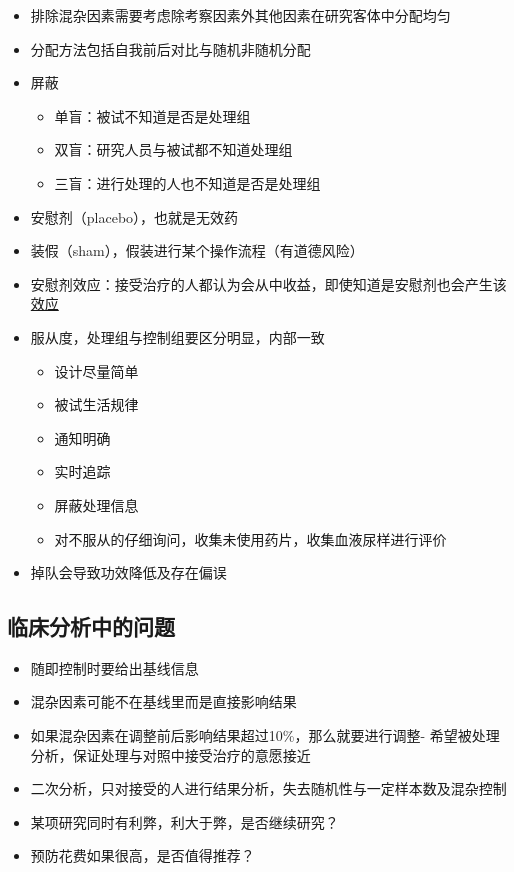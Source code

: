 \documentclass[]{book}
\providecommand{\tightlist}{%
  \setlength{\itemsep}{0pt}\setlength{\parskip}{0pt}}
\begin{document}
\begin{itemize}
\tightlist
\item
  排除混杂因素需要考虑除考察因素外其他因素在研究客体中分配均匀
\item
  分配方法包括自我前后对比与随机非随机分配
\item
  屏蔽

  \begin{itemize}
  \tightlist
  \item
    单盲：被试不知道是否是处理组
  \item
    双盲：研究人员与被试都不知道处理组
  \item
    三盲：进行处理的人也不知道是否是处理组
  \end{itemize}
\item
  安慰剂（placebo），也就是无效药
\item
  装假（sham），假装进行某个操作流程（有道德风险）
\item
  安慰剂效应：接受治疗的人都认为会从中收益，即使知道是安慰剂也会产生该\href{http://journals.plos.org/plosone/article?id=10.1371/journal.pone.0015591}{效应}
\item
  服从度，处理组与控制组要区分明显，内部一致

  \begin{itemize}
  \tightlist
  \item
    设计尽量简单
  \item
    被试生活规律
  \item
    通知明确
  \item
    实时追踪
  \item
    屏蔽处理信息
  \item
    对不服从的仔细询问，收集未使用药片，收集血液尿样进行评价
  \end{itemize}
\item
  掉队会导致功效降低及存在偏误
\end{itemize}

\hypertarget{ux4e34ux5e8aux5206ux6790ux4e2dux7684ux95eeux9898}{%
\subsection{临床分析中的问题}\label{ux4e34ux5e8aux5206ux6790ux4e2dux7684ux95eeux9898}}

\begin{itemize}
\tightlist
\item
  随即控制时要给出基线信息
\item
  混杂因素可能不在基线里而是直接影响结果
\item
  如果混杂因素在调整前后影响结果超过10\%，那么就要进行调整- 希望被处理分析，保证处理与对照中接受治疗的意愿接近
\item
  二次分析，只对接受的人进行结果分析，失去随机性与一定样本数及混杂控制
\item
  某项研究同时有利弊，利大于弊，是否继续研究？
\item
  预防花费如果很高，是否值得推荐？
\end{itemize}
\end{document}
